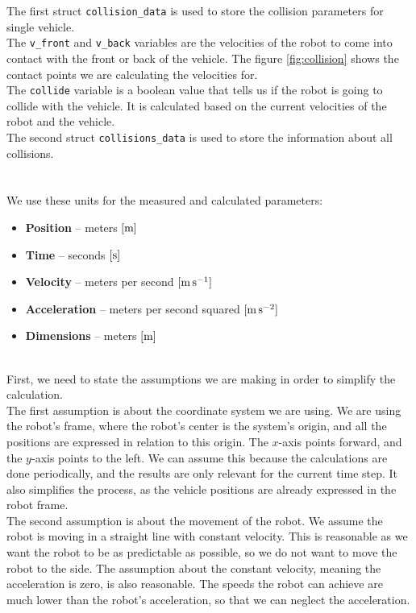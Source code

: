         The first struct \texttt{collision\_data} is used to store the collision parameters for single vehicle.\\
        The \texttt{v\_front} and \texttt{v\_back} variables are the velocities of the robot to come into contact with the front or back of the vehicle. The figure \ref{fig:collision} shows the contact points we are calculating the velocities for.\\
        The \texttt{collide} variable is a boolean value that tells us if the robot is going to collide with the vehicle. It is calculated based on the current velocities of the robot and the vehicle.\\
        The second struct \texttt{collisions\_data} is used to store the information about all collisions.\\\\
    \\
        We use these units for the measured and calculated parameters:
        \begin{itemize}
            \item \textbf{Position} -- meters $[\rm{m}]$
            \item \textbf{Time} -- seconds $[\rm{s}]$
            \item \textbf{Velocity} -- meters per second $[\rm{m\,s^{-1}}]$
            \item \textbf{Acceleration} -- meters per second squared $[\rm{m\,s^{-2}}]$
            \item \textbf{Dimensions} -- meters $[\rm{m}]$
        \end{itemize}
    \\
        First, we need to state the assumptions we are making in order to simplify the calculation.\\
        The first assumption is about the coordinate system we are using. We are using the robot's frame, where the robot's center is the system's origin, and all the positions are expressed in relation to this origin. The $x$-axis points forward, and the $y$-axis points to the left. We can assume this because the calculations are done periodically, and the results are only relevant for the current time step. It also simplifies the process, as the vehicle positions are already expressed in the robot frame.\\
        The second assumption is about the movement of the robot. We assume the robot is moving in a straight line with constant velocity. This is reasonable as we want the robot to be as predictable as possible, so we do not want to move the robot to the side. The assumption about the constant velocity, meaning the acceleration is zero, is also reasonable. The speeds the robot can achieve are much lower than the robot's acceleration, so that we can neglect the acceleration.\\
